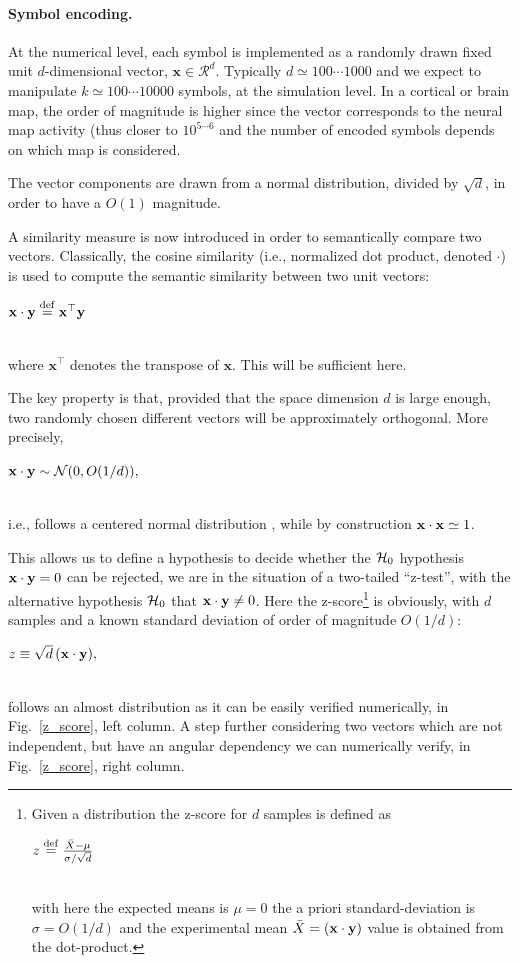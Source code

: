 \documentclass[a4]{article}
\newcommand{\deq}{\stackrel {\rm def}{=}}
\newcommand{\eqline}[1]{~\vspace{0.1cm}\\\centerline{$#1$}\vspace{0.1cm}\\}
\begin{document}
\paragraph{Symbol encoding.}

At the numerical level, each symbol is implemented as a randomly drawn fixed unit $d$-dimensional vector, $\mathbf{x} \in {\mathcal R}^d$. Typically $d\simeq 100 \cdots 1000$ and we expect to manipulate $k\simeq 100 \cdots 10000$ symbols, at the simulation level. In a cortical or brain map, the order of magnitude is higher since the vector corresponds to the neural map activity (thus closer to $10^{5\cdots 6}$ and the number of encoded symbols depends on which map is considered. 

The vector components are drawn from a normal distribution, divided by $\sqrt{d}$, in order to have a $O(1)$ magnitude.

A similarity measure is now introduced in order to semantically compare two vectors. Classically, the cosine similarity (i.e., normalized dot product, denoted $\cdot$) is used to compute the semantic similarity between two unit vectors:
\eqline{\mathbf{x} \cdot \mathbf{y} \deq \mathbf{x}^\top \mathbf{y}}
where $\mathbf{x}^\top$ denotes the transpose of $\mathbf{x}$. This will be sufficient here.

The key property is that, provided that the space dimension $d$ is large enough, two randomly chosen different vectors will be approximately orthogonal. More precisely,
\eqline{{\bf x} \cdot {\bf y} \sim {\mathcal N}(0, O(1/d)),}
i.e., follows a centered normal distribution  \cite{schlegel_comparison_2020}, while by construction ${\bf x} \cdot {\bf x} \simeq 1$.

This allows us to define a hypothesis to decide whether the ${\cal H}_0$ hypothesis ${\bf x} \cdot {\bf y} = 0$ can be rejected, we are in the situation of a two-tailed ``z-test'', with the alternative hypothesis ${\cal H}_0$ that ${\bf x} \cdot {\bf y} \neq 0$. Here the z-score\footnote{Given a distribution the z-score for $d$ samples is defined as 
\eqline{z \deq \frac{\bar{X} - \mu}{\sigma / \sqrt{d}}}
with here the expected means is $\mu = 0$ the a priori standard-deviation is $\sigma = O(1/d)$ and the experimental mean $\bar{X} = ({\bf x} \cdot {\bf y})$ value is obtained from the dot-product.} is obviously, with $d$ samples and a known standard deviation of order of magnitude $O(1/d)$:
\eqline{z \equiv \sqrt{d} \, ({\bf x} \cdot {\bf y}),}
follows an almost distribution as it can be easily verified numerically, in Fig.~\ref{z_score}, left column. A step further considering two vectors which are not independent, but have an angular dependency we can numerically verify, in Fig.~\ref{z_score}, right column.
\end{document}
